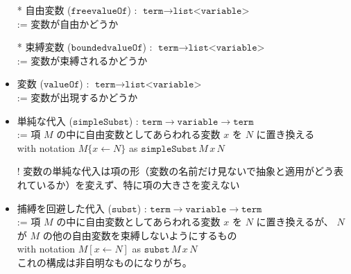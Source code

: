 \documentclass[dvipdfmx]{jsarticle}
\begin{document}
\begin{itemize}
  \item[*] 自由変数 (\(\texttt{freevalueOf}\)) : \(\texttt{term} \to \texttt{list<variable>}\) \\
  := 変数が自由かどうか
  \item[*] 束縛変数 (\(\texttt{boundedvalueOf}\)) : \(\texttt{term} \to \texttt{list<variable>}\) \\
  := 変数が束縛されるかどうか
  \item 変数 (\(\texttt{valueOf}\)) : \(\texttt{term} \to \texttt{list<variable>}\) \\
  := 変数が出現するかどうか
  \item 単純な代入 (\(\texttt{simpleSubst}\)) : \(\texttt{term} \to \texttt{variable} \to \texttt{term}\) \\
    := 項 \(M\) の中に自由変数としてあらわれる変数 \(x\) を \(N\) に置き換える \\
    with notation \(M\{x \leftarrow N\}\) as \(\texttt{simpleSubst} \, M \, x \, N\)
  \item[!] 変数の単純な代入は項の形（変数の名前だけ見ないで抽象と適用がどう表れているか）を変えず、特に項の大きさを変えない
  \item 捕縛を回避した代入 (\(\texttt{subst}\)) : \(\texttt{term} \to \texttt{variable} \to \texttt{term}\) \\
    := 項 \(M\) の中に自由変数としてあらわれる変数 \(x\) を \(N\) に置き換えるが、 \(N\) が \(M\) の他の自由変数を束縛しないようにするもの \\
    with notation \(M[x \leftarrow N]\) as \(\texttt{subst} \, M \, x \, N\) \\
    これの構成は非自明なものになりがち。
\end{itemize}
\end{document}
